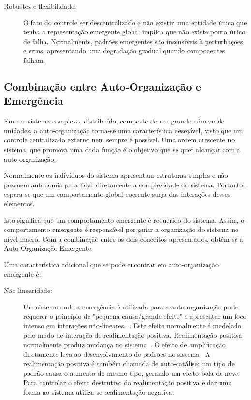 \begin{description}
\item[Robustez e flexibilidade:] O fato do controle ser descentralizado e não existir uma entidade única que tenha a representação emergente global implica que não existe ponto único de falha. Normalmente, padrões emergentes são insensíveis à perturbações e erros, apresentando uma degradação gradual quando componentes falham.

\end{description}


\subsection{Combinação entre Auto-Organização e Emergência}

Em um sistema complexo, distribuído, composto de um grande número de unidades, a auto-organização torna-se uma característica desejável, visto que um controle centralizado externo nem sempre é possível. Uma ordem crescente no sistema, que promova uma dada função é o objetivo que se quer alcançar com a auto-organização. 

Normalmente os indivíduos do sistema apresentam estruturas simples e não possuem autonomia para lidar diretamente a complexidade do sistema. Portanto, espera-se que um comportamento global coerente surja das interações desses elementos. 


Isto significa que um comportamento emergente é requerido do sistema. Assim, o comportamento emergente é responsável por guiar a organização do sistema no nível macro. Com a combinação  entre os dois conceitos apresentados, obtém-se a Auto-Organização Emergente.


Uma característica adicional que se pode encontrar em auto-organização emergente é:
\begin{description}
 \item [Não linearidade:] Um sistema onde a emergência é utilizada para a auto-organização pode requerer o princípio de "pequena causa/grande efeito" e apresentar um foco intenso em interações não-lineares.~\cite{DeWolf2005a}. Este efeito normalmente é modelado pelo modo de interação de realimentação positiva. Realimentação positiva normalmente produz mudança no sistema~\cite{Camazine2001}. O efeito de amplificação diretamente leva ao desenvolvimento de padrões no sistema~\cite{Dressler2007}%
A realimentação positiva é também chamada de auto-catálise: um tipo de padrão causa o aumento do mesmo tipo, gerando um efeito bola de neve. Para controlar o efeito destrutivo da realimentação positiva e dar uma forma ao sistema utiliza-se realimentação negativa.

\end{description}

